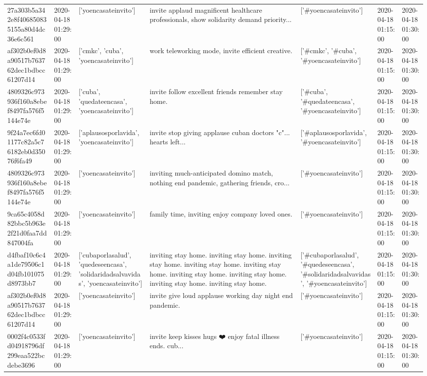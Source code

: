 \begin{tabular}{lllllll}
27a303b5a342e8f406850835155a80d4dc36e6c561 & 2020-04-18 01:29:00 & ['yoencasateinvito'] & invite applaud magnificent healthcare professionals, show solidarity demand priority... & ['#yoencasateinvito'] & 2020-04-18 01:15:00 & 2020-04-18 01:30:00 \\
af302b0ef0d8a90517b763762dec1bdbcc61207d14 & 2020-04-18 01:29:00 & ['cmkc', 'cuba', 'yoencasateinvito'] & work teleworking mode, invite efficient creative. & ['#cmkc', '#cuba', '#yoencasateinvito'] & 2020-04-18 01:15:00 & 2020-04-18 01:30:00 \\
4809326c973936f160a8ebef8497fa576f5144e74e & 2020-04-18 01:29:00 & ['cuba', 'quedateencasa', 'yoencasateinvito'] & invite follow excellent friends remember stay home. & ['#cuba', '#quedateencasa', '#yoencasateinvito'] & 2020-04-18 01:15:00 & 2020-04-18 01:30:00 \\
9f24a7ec6fd01177c82a5c76182eb0d35076f6fa49 & 2020-04-18 01:29:00 & ['aplausosporlavida', 'yoencasateinvito'] & invite stop giving applause cuban doctors "c"... hearts left... & ['#aplausosporlavida', '#yoencasateinvito'] & 2020-04-18 01:15:00 & 2020-04-18 01:30:00 \\
4809326c973936f160a8ebef8497fa576f5144e74e & 2020-04-18 01:29:00 & ['yoencasateinvito'] & inviting much-anticipated domino match, nothing end pandemic, gathering friends, cro... & ['#yoencasateinvito'] & 2020-04-18 01:15:00 & 2020-04-18 01:30:00 \\
9ca65c4058d82bbc5b963e2f21d0faa7dd847004fa & 2020-04-18 01:29:00 & ['yoencasateinvito'] & family time, inviting enjoy company loved ones. & ['#yoencasateinvito'] & 2020-04-18 01:15:00 & 2020-04-18 01:30:00 \\
d4fbaf10c6c4a1de79506c1d04fb101075d8973bb7 & 2020-04-18 01:29:00 & ['cubaporlasalud', 'quedeseencasa', 'solidaridadsalvavidas', 'yoencasateinvito'] & inviting stay home. inviting stay home. inviting stay home. inviting stay home. inviting stay home. inviting stay home. inviting stay home. inviting stay home. inviting stay home. & ['#cubaporlasalud', '#quedeseencasa', '#solidaridadsalvavidas', '#yoencasateinvito'] & 2020-04-18 01:15:00 & 2020-04-18 01:30:00 \\
af302b0ef0d8a90517b763762dec1bdbcc61207d14 & 2020-04-18 01:29:00 & ['yoencasateinvito'] & invite give loud applause working day night end pandemic. & ['#yoencasateinvito'] & 2020-04-18 01:15:00 & 2020-04-18 01:30:00 \\
0002f4c0533fd04918796df299eaa522bcdebe3696 & 2020-04-18 01:29:00 & ['yoencasateinvito'] & invite keep kisses hugs ❤️ enjoy fatal illness ends. cub... & ['#yoencasateinvito'] & 2020-04-18 01:15:00 & 2020-04-18 01:30:00 \\

\end{tabular}
